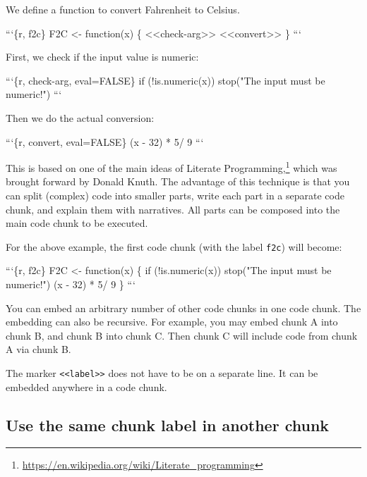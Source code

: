 \documentclass[
  11pt,
]{krantz}
\newenvironment{Shaded}{\begin{snugshade}}{\end{snugshade}}
\newcommand{\BaseNTok}[1]{\textcolor[rgb]{0.06,0.06,0.06}{#1}}
\newcommand{\NormalTok}[1]{#1}
\renewcommand{\href}[2]{#2\footnote{\url{#1}}}
\begin{document}
\begin{Shaded}
\begin{Highlighting}[]
\NormalTok{We define a function to convert Fahrenheit to Celsius.}

\BaseNTok{```\{r, f2c\}}
\BaseNTok{F2C <- function(x) \{}
\BaseNTok{  <<check-arg>>}
\BaseNTok{  <<convert>>}
\BaseNTok{\}}
\BaseNTok{```}

\NormalTok{First, we check if the input value is numeric:}

\BaseNTok{```\{r, check-arg, eval=FALSE\}}
\BaseNTok{  if (!is.numeric(x)) stop("The input must be numeric!")}
\BaseNTok{```}

\NormalTok{Then we do the actual conversion:}

\BaseNTok{```\{r, convert, eval=FALSE\}}
\BaseNTok{  (x - 32) * 5/ 9}
\BaseNTok{```}
\end{Highlighting}
\end{Shaded}

This is based on one of the main ideas of \href{https://en.wikipedia.org/wiki/Literate_programming}{Literate Programming,} which was brought forward by Donald Knuth. The advantage of this technique is that you can split (complex) code into smaller parts, write each part in a separate code chunk, and explain them with narratives. All parts can be composed into the main code chunk to be executed.

For the above example, the first code chunk (with the label \texttt{f2c}) will become:

\begin{Shaded}
\begin{Highlighting}[]
\BaseNTok{```\{r, f2c\}}
\BaseNTok{F2C <- function(x) \{}
\BaseNTok{  if (!is.numeric(x)) stop("The input must be numeric!")}
\BaseNTok{  (x - 32) * 5/ 9}
\BaseNTok{\}}
\BaseNTok{```}
\end{Highlighting}
\end{Shaded}

You can embed an arbitrary number of other code chunks in one code chunk. The embedding can also be recursive. For example, you may embed chunk A into chunk B, and chunk B into chunk C. Then chunk C will include code from chunk A via chunk B.

The marker \texttt{\textless{}\textless{}label\textgreater{}\textgreater{}} does not have to be on a separate line. It can be embedded anywhere in a code chunk.

\hypertarget{same-label}{%
\subsection{Use the same chunk label in another chunk}\label{same-label}}
\end{document}
